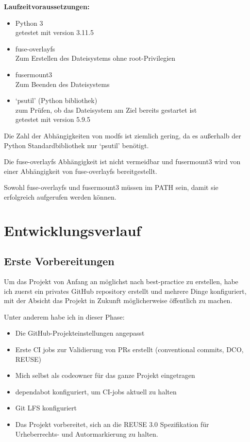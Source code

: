 \documentclass[a4paper,numbers=withenddot,11pt]{scrartcl}
\begin{document}
\textbf{Laufzeitvoraussetzungen:}
\begin{itemize}
  \item Python 3\\
        getestet mit version 3.11.5
  \item fuse-overlayfs\\
        Zum Erstellen des Dateisystems ohne root-Privilegien
  \item fusermount3\\
        Zum Beenden des Dateisystems
  \item `psutil' (Python bibliothek)\\
        zum Prüfen, ob das Dateisystem am Ziel bereits gestartet ist\\
        getestet mit version 5.9.5
\end{itemize}

Die Zahl der Abhängigkeiten von modfs ist ziemlich gering,
da es außerhalb der Python Standardbibliothek nur `psutil' benötigt.

Die fuse-overlayfs Abhängigkeit ist nicht vermeidbar und fusermount3
wird von einer Abhängigkeit von fuse-overlayfs bereitgestellt.

Sowohl fuse-overlayfs und fusermount3 müssen im PATH sein, damit
sie erfolgreich aufgerufen werden können.

\section{Entwicklungsverlauf}

\subsection{Erste Vorbereitungen}

Um das Projekt von Anfang an möglichst nach best-practice zu erstellen,
habe ich zuerst ein privates GitHub repository erstellt und mehrere Dinge konfiguriert,
mit der Absicht das Projekt in Zukunft möglicherweise öffentlich zu machen.

Unter anderem habe ich in dieser Phase:

\begin{itemize}
  \item Die GitHub-Projekteinstellungen angepasst
  \item Erste CI jobs zur Validierung von PRs erstellt (conventional commits, DCO, REUSE)
  \item Mich selbst als codeowner für das ganze Projekt eingetragen
  \item dependabot konfiguriert, um CI-jobs aktuell zu halten
  \item Git LFS konfiguriert
  \item Das Projekt vorbereitet, sich an die REUSE 3.0 Spezifikation
        für Urheberrechts- und Autormarkierung zu halten.
\end{itemize}
\end{document}

